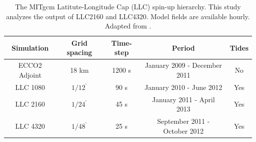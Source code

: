 \documentclass[draft,grl]{agutexSI}
\begin{document}
 \begin{table}
 \label{tab:llc}
 \caption{\small The MITgcm Latitute-Longitude Cap (LLC) spin-up hierarchy. This study analyzes
          the output of LLC2160 and LLC4320. Model fields are available hourly.
          Adapted from \cite{rocha_etal2016}.}
 \begin{center}
 \begin{tabular}{ | c | c | c | c | c |}
 \hline
 Simulation & Grid spacing & Time-step & Period  & Tides \\ \hline
 ECCO2 Adjoint & 18 km & 1200 s & January 2009 - December 2011 & No\\
 LLC 1080   & $1/12^{^\circ}$ & 90 s & January 2010 - June 2012 & Yes \\
 LLC 2160   &  $1/24^{^\circ}$ & 45 s  & January 2011 - April 2013 & Yes\\
 LLC 4320   &  $1/48^{^\circ}$ & 25 s & September 2011 - October 2012 & Yes \\
 \hline
 \end{tabular}
 \end{center}
 \end{table}



%
%
\end{document}
